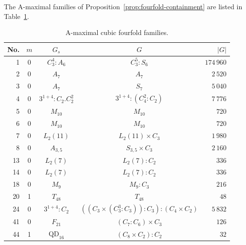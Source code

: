 \documentclass[12pt]{amsart}
\numberwithin{equation}{section}
\theoremstyle{plain}
\theoremstyle{definition}
\theoremstyle{remark}
\begin{document}
The A-maximal families of Proposition~\ref{prop:fourfold-containment}
are listed in Table~\ref{tab:fourfold-action-maximal}.

\begin{table}[htbp]
\centering
\caption{A-maximal cubic fourfold families.}
\label{tab:fourfold-action-maximal}
\begin{tabular}{@{}rcccr@{}}
\toprule
No. & $m$ & $G_s$ & $G$ & $|G|$ \\
\midrule
1   & 0 & $C_3^4:A_6$                  & $C_3^5:S_6$                                      & $174\,960$ \\
2   & 0 & $A_7$                        & $A_7$                                            & $2\,520$ \\
3   & 0 & $A_7$                        & $S_7$                                            & $5\,040$ \\
4   & 0 & $3^{1+4}:C_2.C_2^2$          & $3^{1+4}:(C_4^2:C_2)$                           & $7\,776$ \\
5   & 0 & $M_{10}$                     & $M_{10}$                                         & $720$ \\
6   & 0 & $M_{10}$                     & $M_{10}$                                         & $720$ \\
7   & 0 & $L_2(11)$                    & $L_2(11)\times C_3$                             & $1\,980$ \\
8   & 0 & $A_{3,5}$                    & $S_{3,5}\times C_3$                             & $2\,160$ \\
13  & 0 & $L_2(7)$                     & $L_2(7):C_2$                                     & $336$ \\
14  & 0 & $L_2(7)$                     & $L_2(7):C_2$                                     & $336$ \\
18  & 0 & $M_9$                        & $M_9:C_3$                                        & $216$ \\
20  & 1 & $T_{48}$                     & $T_{48}$                                         & $48$ \\
24  & 0 & $3^{1+4}:C_2$                & $((C_3\times(C_3^3:C_3)):C_3):(C_4\times C_2)$ & $5\,832$ \\
41  & 0 & $F_{21}$                     & $(C_7:C_6)\times C_3$                           & $126$ \\
44  & 1 & $\mathrm{QD}_{16}$           & $(C_8\times C_2):C_2$                           & $32$ \\

\end{tabular}
\end{table}
\end{document}
